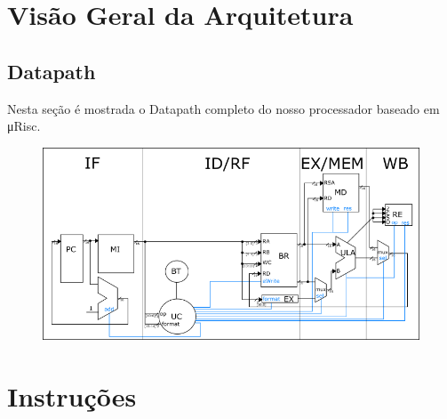 \documentclass{article}
\begin{document}
  
  \newpage
\section{Visão Geral da Arquitetura}


\subsection{Datapath}
Nesta seção é mostrada o Datapath completo do nosso processador baseado em \si\micro Risc.
\begin{figure}[H]
	\centering
	\includegraphics[width=\textwidth]{./pictures/datapath.png}
\end{figure}


\section{Instruções}
\end{document}
